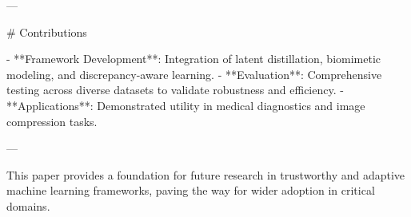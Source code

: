 ---

# Contributions

- **Framework Development**: Integration of latent distillation, biomimetic modeling, and discrepancy-aware learning.
- **Evaluation**: Comprehensive testing across diverse datasets to validate robustness and efficiency.
- **Applications**: Demonstrated utility in medical diagnostics and image compression tasks.

---

This paper provides a foundation for future research in trustworthy and adaptive machine learning frameworks, paving the way for wider adoption in critical domains.